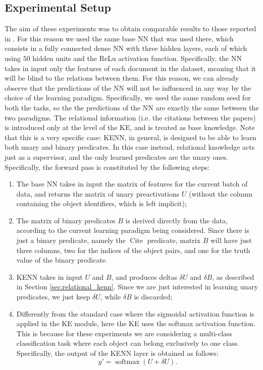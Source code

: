 \subsection{Experimental Setup}
The aim of these experiments was to obtain comparable results to those reported in \cite{marra2020relational}. For this reason we used the same base NN that was used there, which consists in a fully connected dense NN with three hidden layers, each of which using $50$ hidden units and the ReLu activation function. Specifically, the NN takes in input only the features of each document in the dataset, meaning that it will be blind to the relations between them. For this reason, we can already observe that the predictions of the NN will not be influenced in any way by the choice of the learning paradigm. Specifically, we used the same random seed for both the tasks, so the the predictions of the NN are exactly the same between the two paradigms.
The relational information (i.e. the citations between the papers) is introduced only at the level of the KE, and is treated as base knowledge. Note that this is a very specific case: KENN, in general, is designed to be able to learn both unary and binary predicates. In this case instead, relational knowledge acts just as a supervisor, and the only learned predicates are the unary ones. Specifically, the forward pass is constituted by the following steps:
\begin{enumerate}
	\item The base NN takes in input the matrix of features for the current batch of data, and returns the matrix of unary preactivations $U$ (without the column containing the object identifiers, which is left implicit);
	\item The matrix of binary predicates $B$ is derived directly from the data, according to the current learning paradigm being considered. Since there is just a binary predicate, namely the $\operatorname{Cite}$ predicate, matrix $B$ will have just three columns, two for the indices of the object pairs, and one for the truth value of the binary predicate. 
	\item KENN takes in input $U$ and $B$, and produces deltas $\delta U$ and $\delta B$, as described in Section \ref{sec:relational_kenn}. Since we are just interested in learning unary predicates, we just keep $\delta U$, while $\delta B$ is discarded;
	\item Differently from the standard case where the sigmoidal activation function is applied in the KE module, here the KE uses the softmax activation function. This is because for these experiments we are considering a multi-class classification task where each object can belong exclusively to one class. Specifically, the output of the KENN layer is obtained as follows:
	\begin{equation*}
	y'= \operatorname{softmax}(U + \delta U).
	\end{equation*}
	
\end{enumerate}

